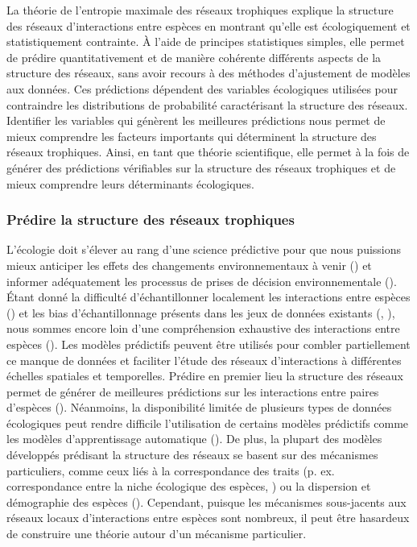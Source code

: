 La théorie de l'entropie maximale des réseaux trophiques explique la structure
des réseaux d'interactions entre espèces en montrant qu'elle est écologiquement
et statistiquement contrainte. À l'aide de principes statistiques simples, elle
permet de prédire quantitativement et de manière cohérente différents aspects de
la structure des réseaux, sans avoir recours à des méthodes d'ajustement de
modèles aux données. Ces prédictions dépendent des variables écologiques
utilisées pour contraindre les distributions de probabilité caractérisant la
structure des réseaux. Identifier les variables qui génèrent les meilleures
prédictions nous permet de mieux comprendre les facteurs importants qui
déterminent la structure des réseaux trophiques. Ainsi, en tant que théorie
scientifique, elle permet à la fois de générer des prédictions vérifiables sur
la structure des réseaux trophiques et de mieux comprendre leurs déterminants
écologiques. 

\subsubsection{Prédire la structure des réseaux trophiques} 

L'écologie doit s'élever au rang d'une science prédictive pour que nous
puissions mieux anticiper les effets des changements environnementaux à venir
(\cite{Evans2012Predictive}) et informer adéquatement les processus de prises de
décision environnementale (\cite{Clark2001Ecological}). Étant donné la
difficulté d'échantillonner localement les interactions entre espèces
(\cite{Jordano2016Sampling}) et les bias d'échantillonnage présents dans les
jeux de données existants (\cite{Aguiar2019Revealing}, \cite{Poisot2021Global}),
nous sommes encore loin d'une compréhension exhaustive des interactions entre
espèces (\cite{Hortal2015Seven}). Les modèles prédictifs peuvent être utilisés
pour combler partiellement ce manque de données et faciliter l'étude des réseaux
d'interactions à différentes échelles spatiales et temporelles. Prédire en
premier lieu la structure des réseaux permet de générer de meilleures
prédictions sur les interactions entre paires d'espèces
(\cite{Strydom2021Roadmapa}). Néanmoins, la disponibilité limitée de plusieurs
types de données écologiques peut rendre difficile l'utilisation de certains
modèles prédictifs comme les modèles d'apprentissage automatique
(\cite{Strydom2021Roadmapa}).  De plus, la plupart des modèles développés
prédisant la structure des réseaux se basent sur des mécanismes particuliers,
comme ceux liés à la correspondance des traits (p. ex. correspondance entre la
niche écologique des espèces, \cite{Williams2000Simple}) ou la dispersion et
démographie des espèces (\cite{Canard2012Emergence}). Cependant, puisque les
mécanismes sous-jacents aux réseaux locaux d'interactions entre espèces sont
nombreux, il peut être hasardeux de construire une théorie autour d'un mécanisme
particulier. 

